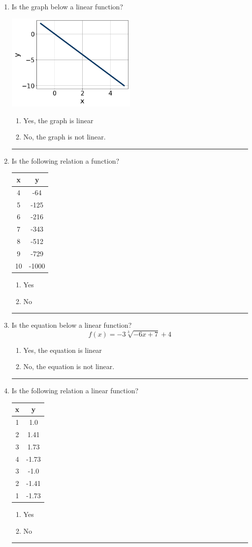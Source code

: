 \documentclass[14pt]{extbook}
\newcommand{\litem}[1]{\item#1\hspace*{-1cm}\rule{\textwidth}{0.4pt}}
\begin{document}
\begin{enumerate}
\litem{
Is the graph below a linear function?
\begin{center}
    \includegraphics[width=0.5\textwidth]{../Figures/MA_8_F_1_2_graphM.png}
\end{center}
\begin{enumerate}[label=\Alph*.]
\item Yes, the graph is linear
\item No, the graph is not linear.

\end{enumerate} }
\litem{
Is the following relation a function?

\begin{tabular}{c|c}
x &y\tabularnewline \hline
4 &-64\tabularnewline \hline
5 &-125\tabularnewline \hline
6 &-216\tabularnewline \hline
7 &-343\tabularnewline \hline
8 &-512\tabularnewline \hline
9 &-729\tabularnewline \hline
10 &-1000\end{tabular}\begin{enumerate}[label=\Alph*.]
\item Yes
\item No

\end{enumerate} }
\litem{
Is the equation below a linear function?\[ f(x) = {-3}\sqrt[3]{-6x + 7}+4 \]\begin{enumerate}[label=\Alph*.]
\item Yes, the equation is linear
\item No, the equation is not linear.

\end{enumerate} }
\litem{
Is the following relation a linear function?

\begin{tabular}{c|c}
x &y\tabularnewline \hline
1 &1.0\tabularnewline \hline
2 &1.41\tabularnewline \hline
3 &1.73\tabularnewline \hline
4 &-1.73\tabularnewline \hline
3 &-1.0\tabularnewline \hline
2 &-1.41\tabularnewline \hline
1 &-1.73\end{tabular}\begin{enumerate}[label=\Alph*.]
\item Yes
\item No

\end{enumerate} }
\end{enumerate}
\end{document}
